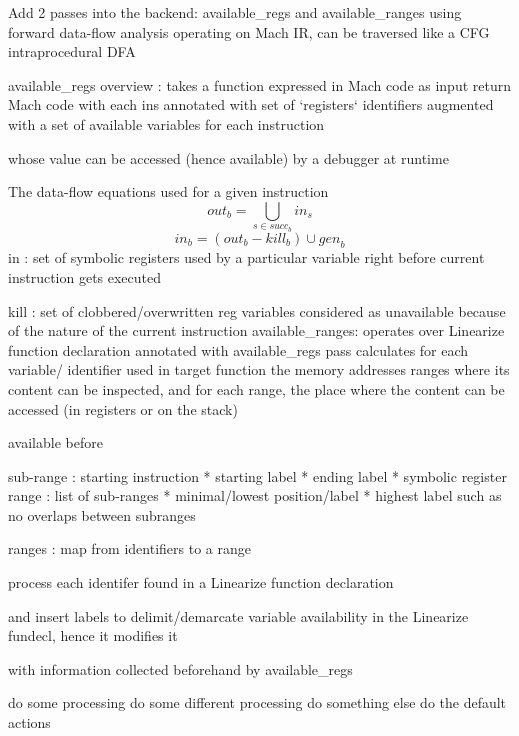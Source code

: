 Add 2 passes into the backend: available\_regs and available\_ranges
using forward data-flow analysis operating on Mach IR, can be traversed like
a CFG
intraprocedural DFA

available\_regs overview :
takes a function expressed in Mach code as input
return Mach code with each ins annotated with set of `registers` identifiers
augmented with a set of available variables for each instruction

whose value can be accessed (hence available) by a debugger at runtime

The data-flow equations used for a given instruction
\[
    \textit{out}_{b} = \bigcup_{s \in succ_{b}} \textit{in}_{s}
\]
\[
    \textit{in}_{b} = (\textit{out}_{b} - \textit{kill}_{b}) \cup \textit{gen}_{b}
\]
in : set of symbolic registers used by a particular variable right before
current instruction gets executed

kill : set of clobbered/overwritten reg variables considered as unavailable because of the nature of the
current instruction
available\_ranges:
operates over Linearize function declaration annotated with available\_regs pass
calculates for each variable/ identifier used in target function the memory
addresses ranges where its content can be inspected, and for each range, the
place where the content can be accessed (in registers or on the stack)

available before

sub-range : starting instruction * starting label * ending label * symbolic
register
range : list of sub-ranges * minimal/lowest position/label * highest label
such as no overlaps between subranges



ranges : map from identifiers to a range

process each identifer found in a Linearize function declaration

and insert labels to delimit/demarcate variable availability in the Linearize
fundecl, hence it modifies it

with information collected beforehand by available\_regs

\begin{algorithmic}[1]
    \State do some processing
    \State do some different processing
    \State do something else
    \Else
    \State do the default actions
    \EndIf
\end{algorithmic}


